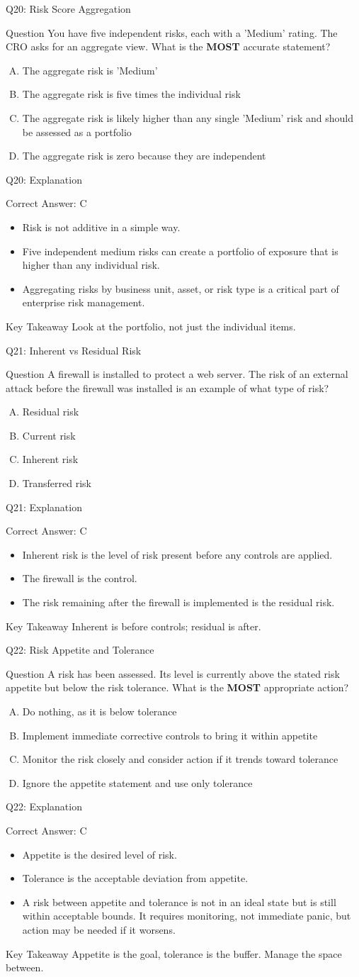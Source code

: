 \documentclass[aspectratio=169]{beamer}
\newcommand{\hq}[7]{%
	\begin{frame}{Q#1: #2}
		\begin{block}{Question}
			#3
		\end{block}
		\begin{enumerate}[(A)]
			#4
		\end{enumerate}
	\end{frame}
	\begin{frame}{Q#1: Explanation}
		\begin{block}{Correct Answer: #5}
			\begin{itemize}
				#6
			\end{itemize}
		\end{block}
		\begin{alertblock}{Key Takeaway}
			#7
		\end{alertblock}
	\end{frame}
}
\begin{document}
	\hq{20}{Risk Score Aggregation}
	{You have five independent risks, each with a 'Medium' rating. The CRO asks for an aggregate view. What is the \textbf{MOST} accurate statement?}
	{\item The aggregate risk is 'Medium'
		\item The aggregate risk is five times the individual risk
		\item The aggregate risk is likely higher than any single 'Medium' risk and should be assessed as a portfolio
		\item The aggregate risk is zero because they are independent}
	{C}
	{\item Risk is not additive in a simple way.
		\item Five independent medium risks can create a portfolio of exposure that is higher than any individual risk.
		\item Aggregating risks by business unit, asset, or risk type is a critical part of enterprise risk management.}
	{Look at the portfolio, not just the individual items.}
	
	\hq{21}{Inherent vs Residual Risk}
	{A firewall is installed to protect a web server. The risk of an external attack before the firewall was installed is an example of what type of risk?}
	{\item Residual risk
		\item Current risk
		\item Inherent risk
		\item Transferred risk}
	{C}
	{\item Inherent risk is the level of risk present before any controls are applied.
		\item The firewall is the control.
		\item The risk remaining after the firewall is implemented is the residual risk.}
	{Inherent is before controls; residual is after.}
	
	\hq{22}{Risk Appetite and Tolerance}
	{A risk has been assessed. Its level is currently above the stated risk appetite but below the risk tolerance. What is the \textbf{MOST} appropriate action?}
	{\item Do nothing, as it is below tolerance
		\item Implement immediate corrective controls to bring it within appetite
		\item Monitor the risk closely and consider action if it trends toward tolerance
		\item Ignore the appetite statement and use only tolerance}
	{C}
	{\item Appetite is the desired level of risk.
		\item Tolerance is the acceptable deviation from appetite.
		\item A risk between appetite and tolerance is not in an ideal state but is still within acceptable bounds. It requires monitoring, not immediate panic, but action may be needed if it worsens.}
	{Appetite is the goal, tolerance is the buffer. Manage the space between.}
	
\end{document}
